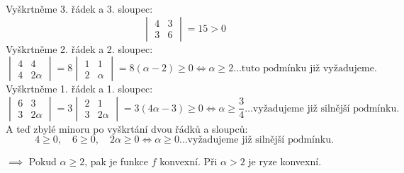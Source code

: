 Vyškrtněme 3. řádek a 3. sloupec:
\[
    \begin{vmatrix}
        4 & 3 \\
        3 & 6
    \end{vmatrix} = 15 > 0
\]
Vyškrtněme 2. řádek a 2. sloupec:
\[
    \begin{vmatrix}
        4 & 4 \\
        4 & 2 \alpha
    \end{vmatrix} = 8
    \begin{vmatrix}
        1 & 1 \\
        2 & \alpha
    \end{vmatrix} = 8 (\alpha -2) \geq 0 \iff \alpha \geq 2 \dots \text{tuto podmínku již vyžadujeme.}
\]
Vyškrtněme 1. řádek a 1. sloupec:
\[
    \begin{vmatrix}
        6 & 3 \\
        3 & 2 \alpha
    \end{vmatrix} = 3
    \begin{vmatrix}
        2 & 1 \\
        3 & 2\alpha
    \end{vmatrix} = 3 (4\alpha -3) \geq 0 \iff \alpha \geq \frac{3}{4} \dots \text{vyžadujeme již silnější podmínku.}
\]
A teď zbylé minoru po vyškrtání dvou řádků a sloupců:
\[
    4 \geq 0, \quad 6 \geq 0, \quad 2 \alpha \geq 0 \iff \alpha \geq 0 \dots \text{vyžadujeme již silnější podmínku.}
\]

$\implies$ Pokud $\alpha \geq 2$, pak je funkce $f$ konvexní. Při $\alpha > 2$ je ryze konvexní.